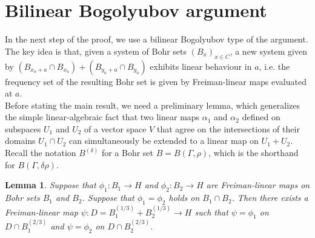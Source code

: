 \documentclass[a4paper,11pt]{article}
\numberwithin{theorem}{section}
\newtheorem{lemma}[theorem]{Lemma}
\theoremstyle{definition}
\begin{document}
\section{Bilinear Bogolyubov argument}\label{bilbogsection}

In the next step of the proof, we use a bilinear Bogolyubov type of the argument. The key idea is that, given a system of Bohr sets $(B_x)_{x \in C}$, a new system given by $(B_{x_a+a} \cap B_{x_a}) + (B_{y_a+a} \cap B_{y_a})$ exhibits linear behaviour in $a$, i.e. the frequency set of the resulting Bohr set is given by Freiman-linear maps evaluated at $a$.\\

Before stating the main result, we need a preliminary lemma, which generalizes the simple linear-algebraic fact that two linear maps $\alpha_1$ and $\alpha_2$ defined on subspaces $U_1$ and $U_2$ of a vector space $V$ that agree on the intersections of their domains $U_1 \cap U_2$ can simultaneously be extended to a linear map on $U_1 + U_2$.\\
\indent Recall the notation $B^{(\delta)}$ for a Bohr set $B = B(\Gamma, \rho)$, which is the shorthand for $B(\Gamma, \delta \rho)$.

\begin{lemma}\label{flinearextn}
    Suppose that $\phi_1 : B_1 \to H$ and $\phi_2 : B_2 \to H$ are Freiman-linear maps on Bohr sets $B_1$ and $B_2$. Suppose that $\phi_1 = \phi_2$ holds on $B_1 \cap B_2$. Then there exists a Freiman-linear map $\psi : D = B_1^{(1/3)} + B_2^{(1/3)} \to H$ such that $\psi = \phi_1$ on $D \cap B_1^{(2/3)}$ and $\psi = \phi_2$ on $D \cap B_2^{(2/3)}$.
\end{lemma}
\end{document}
